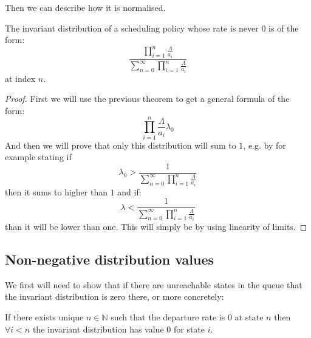 Then we can describe how it is normalised.
\begin{lemma}\label{lem:NormalInvariantDistributionForm}
  The invariant distribution of a scheduling policy whose rate is never $0$ is of the form:
  $$\frac{\prod_{i=1}^{n} \frac{\Lambda}{a_i}}{\sum_{n=0}^\infty \prod_{i=1}^{n} \frac{\Lambda}{a_i}}$$
  at index $n$.
\end{lemma}

\begin{proof}
  First we will use the previous theorem to get a general formula of the form:
  $$\prod_{i=1}^n \frac{\Lambda}{a_i} \lambda_0$$
  And then we will prove that only this distribution will sum to $1$, e.g. by for example stating
  if $$\lambda_0 > \frac{1}{\sum_{n=0}^\infty \prod_{i=1}^{n} \frac{\Lambda}{a_i}}$$
  then it sums to higher than $1$ and if:
  $$\lambda < \frac{1}{\sum_{n=0}^\infty \prod_{i=1}^{n} \frac{\Lambda}{a_i}}$$
  than it will be lower than one. This will simply be by using linearity of limits.
\end{proof}


\subsection{Non-negative distribution values}
We first will need to show that if there are unreachable states in the queue that the invariant
distribution is zero there, or more concretely:
\begin{lemma}\label{lem:UnreachableInvariantDistribution}
  If there exists unique $n \in \mathbb{N}$ such that the departure rate is $0$ at state $n$ then $\forall
  i < n$ the invariant distribution has value $0$ for state $i$.
\end{lemma}

